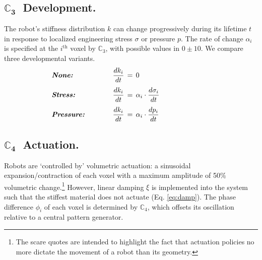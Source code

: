 \subsection*{$\mathbf{\mathbb{C}_3}\;$ Development.}
The robot's stiffness distribution $k$ 
can change progressively during its lifetime $t$ in response to localized engineering stress $\sigma$ or pressure $p$.
The rate of change $\alpha_i$ is specified at the $i^{\text{th}}$ voxel by $\mathbb{C}_3$, with possible values in $0\pm10$.
We compare three developmental variants.
\begin{align}
&\textit{\textbf{None:}} 
\hspace{2em} &\frac{dk_i}{dt}& \,=\, 0 
\hspace{10em}
\label{eq:none} \\[0.35em]
&\textit{\textbf{Stress:}} \hspace{3em} &\frac{dk_i}{dt}& \,=\, \alpha_i \cdot \frac{d\sigma_i}{dt} 
\label{eq:stress} \\[0.35em]
&\textit{\textbf{Pressure:}} \hspace{3em} &\frac{dk_i}{dt}& \,=\, \alpha_i \cdot \frac{dp_i}{dt} 
\label{eq:pressure}
\end{align}

\subsection*{$\mathbf{\mathbb{C}_4}\;$ Actuation.}
Robots are `controlled by' volumetric actuation: a sinusoidal expansion/contraction of each voxel with a maximum amplitude of 50\% volumetric change.\footnote{The scare quotes are intended to highlight the fact that actuation policies no more dictate the movement of a robot than its geometry.}
However, linear damping $\xi$ is implemented into the system such that the stiffest material does not actuate (Eq. \ref{eq:damp}). 
The phase difference $\phi_i$ of each voxel is determined by $\mathbb{C}_4$, which offsets its oscillation relative to a central pattern generator.

